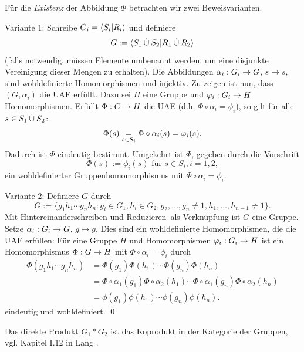\documentclass[a4paper, 12pt, twoside]{article}
\begin{document}
Für die \textsl{Existenz} der Abbildung $\Phi$ betrachten wir zwei
Beweisvarianten.

Variante 1: Schreibe $G_i = \lag S_i|R_i \rag$ und definiere
\[
G := \lag S_1 \os{\cup}{.} S_2 | R_1 \os{\cup}{.} R_2 \rag
\]
(falls notwendig, müssen Elemente umbenannt werden, um eine
disjunkte Vereinigung dieser Mengen zu erhalten).
Die Abbildungen $\alpha_i:G_i\Ra G$, $s\mapsto s$, sind
wohldefinierte Homomorphismen und injektiv.
Zu zeigen ist nun, dass $(G,\alpha_i)$ die UAE erfüllt.
Dazu sei $H$ eine Gruppe und $\phi_i:G_i\Ra H$ Homomorphismen.
Erfüllt $\Phi:G\Ra H$ die UAE (d.h. $\Phi\circ\alpha_i=\phi_i$), so gilt für
alle $s\in S_1\os{\cup}{.} S_2$:
\[
\Phi(s) \us{=}{s\in S_i} \Phi\circ\alpha_i(s)
=\phi_i(s).
\]
Dadurch ist $\Phi$ eindeutig bestimmt.
Umgekehrt ist $\Phi$, gegeben durch die Vorschrift
\[
\Phi(s) := \phi_i(s) \text{ für } s\in S_i, i=1,2,
\]
ein wohldefinierter Gruppenhomomorphismus mit
$\Phi\circ\alpha_i=\phi_i$.

Variante 2: Definiere $G$ durch
\[
G := \{ g_1 h_1 \cdots g_n h_n : g_i\in G_1, h_i \in G_2,
g_2,\ldots,g_n\neq 1, h_1,\ldots,h_{n-1}\neq 1\}.
\]
Mit \glqq Hintereinanderschreiben und Reduzieren\grqq\ als 
Verknüpfung ist $G$ eine Gruppe.
Setze $\alpha_i:G_i\Ra G$, $g\mapsto g$.
Dies sind ein wohldefinierte Homomorphismen, die die UAE erfüllen:
Für eine Gruppe $H$ und Homomorphismen $\phi_i:G_i\Ra H$ ist
ein Homomorphismus $\Phi:G\Ra H$ mit $\Phi\circ\alpha_i=\phi_i$
durch
\begin{align*}
\Phi(g_1 h_1\cdots g_n h_n) &=
\Phi(g_1)\Phi(h_1)\cdots \Phi(g_n)\Phi(h_n) \\
&= \Phi\circ\alpha_1(g_1)\Phi\circ\alpha_2(h_1)\cdots\Phi\circ\alpha_1(g_n)\Phi\circ\alpha_2(h_n) \\
&= \phi(g_1)\phi(h_1)\cdots \phi(g_n)\phi(h_n).
\end{align*}
eindeutig und wohldefiniert.
\qed

\BEM Das direkte Produkt $G_1*G_2$ ist das Koprodukt in der Kategorie
der Gruppen, vgl. Kapitel I.12 in Lang \cite{lang}.
\end{document}
